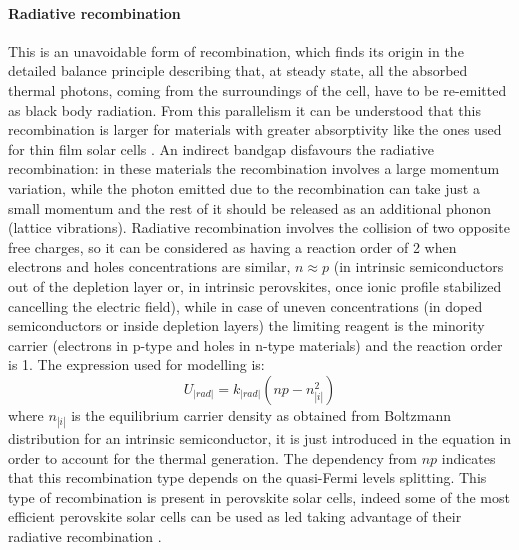 		\paragraph{Radiative recombination}
		This is an unavoidable form of recombination, which finds its origin in the detailed balance principle describing that, at steady state, all the absorbed thermal photons, coming from the surroundings of the cell, have to be re-emitted as black body radiation.
		From this parallelism it can be understood that this recombination is larger for materials with greater absorptivity \cite{Nelson2003} like the ones used for thin film solar cells \cite{Tvingstedt2015}.
		An indirect bandgap disfavours the radiative recombination: in these materials the recombination involves a large momentum variation, while the photon emitted due to the recombination can take just a small momentum and the rest of it should be released as an additional phonon (lattice vibrations).
		Radiative recombination involves the collision of two opposite free charges, so it can be considered as having a reaction order of 2 when electrons and holes concentrations are similar, $n \approx p$ (in intrinsic semiconductors out of the depletion layer or, in intrinsic perovskites, once ionic profile stabilized cancelling the electric field), while in case of uneven concentrations (in doped semiconductors or inside depletion layers) the limiting reagent is the minority carrier (electrons in p-type and holes in n-type materials) and the reaction order is 1.
		The expression used for modelling is:
		 \begin{equation}
		U_|rad| = k_|rad| (np-n_|i|^2)
				\end{equation}
		where $n_|i|$ is the equilibrium carrier density as obtained from Boltzmann distribution for an intrinsic semiconductor, it is just introduced in the equation in order to account for the thermal generation.
		The dependency from $np$ indicates that this recombination type depends on the quasi\hyp{}Fermi levels splitting.
		This type of recombination is present in perovskite solar cells, indeed some of the most efficient perovskite solar cells can be used as \gls{led} taking advantage of their radiative recombination \cite{Bi2016}.

